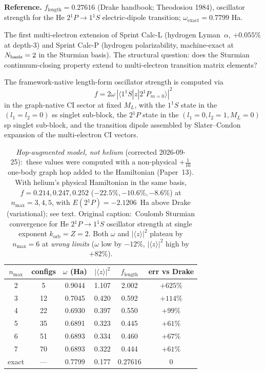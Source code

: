 \documentclass[11pt]{article}
\begin{document}
\textbf{Reference.}  $f_\text{length} = 0.27616$ (Drake handbook;
Theodosiou 1984), oscillator strength for the He $2{}^1P \to 1{}^1S$
electric-dipole transition; $\omega_\text{exact} = 0.7799$ Ha.

The first multi-electron extension of Sprint Calc-L (hydrogen Lyman~$\alpha$,
$+0.055\%$ at depth-3) and Sprint Calc-P (hydrogen polarizability,
machine-exact at $N_{\rm basis}=2$ in the Sturmian basis).  The
structural question: does the Sturmian continuum-closing property
extend to multi-electron transition matrix elements?

The framework-native length-form oscillator strength is computed via
\[
f = 2\omega\, |\langle 1{}^1\!S | z | 2{}^1\!P_{m=0}\rangle|^2
\]
in the graph-native CI sector at fixed $M_L$, with the $1{}^1\!S$ state in
the $(l_1=l_2=0)$ ss singlet sub-block, the $2{}^1\!P$ state in the
$(l_1=0, l_2=1, M_L=0)$ sp singlet sub-block, and the transition dipole
assembled by Slater--Condon expansion of the multi-electron CI vectors.

\begin{table}[h]
\centering\small
\begin{tabular}{c c c c c c}
\toprule
$n_{\max}$ & configs & $\omega$ (Ha) & $|\langle z\rangle|^2$ & $f_\text{length}$ & err vs Drake \\
\midrule
2 & 5 & 0.9044 & 1.107 & 2.002 & $+625\%$ \\
3 & 12 & 0.7045 & 0.420 & 0.592 & $+114\%$ \\
4 & 22 & 0.6930 & 0.397 & 0.550 & $+99\%$ \\
5 & 35 & 0.6891 & 0.323 & 0.445 & $+61\%$ \\
6 & 51 & 0.6893 & 0.334 & 0.460 & $+67\%$ \\
7 & 70 & 0.6893 & 0.322 & 0.444 & $+61\%$ \\
\midrule
exact & --- & 0.7799 & 0.177 & 0.27616 & 0 \\
\bottomrule
\end{tabular}
\caption{\emph{Hop-augmented model, not helium} (corrected
2026-09-25):\ these values were computed with a non-physical
$+\tfrac{1}{16}$ one-body graph hop added to the Hamiltonian
(Paper~13).  With helium's physical Hamiltonian in the same basis,
$f = 0.214, 0.247, 0.252$ ($-22.5\%, -10.6\%, -8.6\%$) at
$n_{\max} = 3, 4, 5$, with $E(2{}^1\!P) = -2.1206$~Ha above Drake
(variational); see text.  Original caption:\ Coulomb Sturmian convergence for He $2{}^1P \to 1{}^1S$
oscillator strength at single exponent $k_\text{orb} = Z = 2$.  Both
$\omega$ and $|\langle z\rangle|^2$ plateau by $n_{\max} = 6$ at
\emph{wrong limits} ($\omega$ low by $-12\%$, $|\langle z\rangle|^2$
high by $+82\%$).}
\label{tab:autopsy_he_oscillator}
\end{table}
\end{document}
